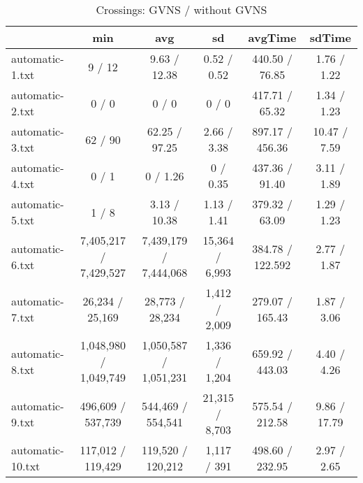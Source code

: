 \documentclass{scrartcl}
\begin{document}
\begin{table}
\scriptsize
\begin{tabular}{lccccc}
  \toprule  & min & avg & sd & avgTime & sdTime \\ 
  \midrule automatic-1.txt & 9 / 12 & 9.63 / 12.38 & 0.52 / 0.52 & 440.50 / 76.85 & 1.76 / 1.22 \\ 
  automatic-2.txt & 0 / 0 & 0 / 0  & 0 / 0 & 417.71 / 65.32 & 1.34 / 1.23 \\ 
  automatic-3.txt & 62 / 90 & 62.25 / 97.25 & 2.66 / 3.38 & 897.17 / 456.36 & 10.47 / 7.59 \\ 
  automatic-4.txt & 0 / 1 & 0 / 1.26 & 0 / 0.35 & 437.36 / 91.40 & 3.11 / 1.89 \\ 
  automatic-5.txt & 1 / 8 & 3.13 / 10.38 & 1.13 / 1.41 & 379.32 / 63.09 & 1.29 / 1.23 \\ 
  automatic-6.txt & 7,405,217 / 7,429,527 & 7,439,179 / 7,444,068 & 15,364 / 6,993 & 384.78 / 122.592 & 2.77 / 1.87 \\ 
  automatic-7.txt & 26,234 / 25,169 & 28,773 / 28,234 & 1,412 / 2,009 & 279.07 / 165.43 & 1.87 / 3.06 \\ 
  automatic-8.txt & 1,048,980 / 1,049,749 & 1,050,587 / 1,051,231  & 1,336 / 1,204 & 659.92 / 443.03 & 4.40 / 4.26 \\ 
  automatic-9.txt & 496,609 / 537,739 & 544,469 / 554,541 & 21,315 / 8,703 & 575.54 / 212.58 & 9.86 / 17.79 \\ 
  automatic-10.txt & 117,012 / 119,429 & 119,520 / 120,212 & 1,117 / 391 & 498.60 / 232.95 & 2.97 / 2.65 \\ 
  \bottomrule 
\end{tabular}
\caption{Crossings: GVNS / without GVNS}
\label{tab:results}
\end{table}
\end{document}
